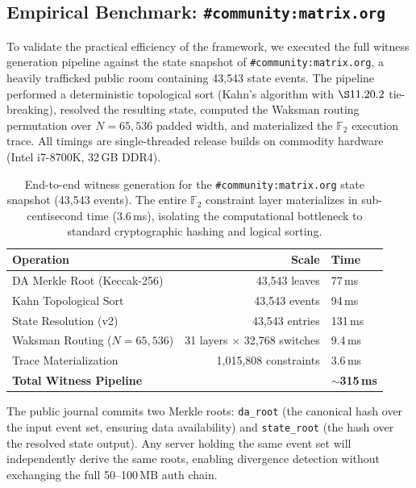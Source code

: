 \documentclass[11pt,a4paper]{article}
\begin{document}
\subsection{Empirical Benchmark: \texttt{\#community:matrix.org}}\label{sec:bench}

To validate the practical efficiency of the framework, we executed the
full witness generation pipeline against the state snapshot of
\texttt{\#community:matrix.org}, a heavily trafficked public room
containing 43{,}543 state events.  The pipeline performed a
deterministic topological sort (Kahn's algorithm with
$\S11.20.2$ tie-breaking), resolved the resulting state,
computed the Waksman routing permutation over $N = 65{,}536$ padded
width, and materialized the $\mathbb{F}_2$ execution trace.
All timings are single-threaded release builds on commodity hardware
(Intel i7-8700K, 32\,GB DDR4).

\begin{table}[h]
\centering
\begin{tabular}{@{}lrl@{}}
\toprule
\textbf{Operation} & \textbf{Scale} & \textbf{Time} \\
\midrule
DA Merkle Root (Keccak-256) & 43{,}543 leaves & 77\,ms \\
Kahn Topological Sort       & 43{,}543 events & 94\,ms \\
State Resolution (v2)       & 43{,}543 entries & 131\,ms \\
Waksman Routing ($N{=}65{,}536$) & 31 layers $\times$ 32{,}768 switches & 9.4\,ms \\
Trace Materialization       & 1{,}015{,}808 constraints & 3.6\,ms \\
\midrule
\textbf{Total Witness Pipeline} & & \textbf{$\sim$315\,ms} \\
\bottomrule
\end{tabular}
\caption{End-to-end witness generation for the
\texttt{\#community:matrix.org} state snapshot (43{,}543 events).
The entire $\mathbb{F}_2$ constraint layer materializes in
sub-centisecond time (3.6\,ms), isolating the computational
bottleneck to standard cryptographic hashing and logical sorting.}
\label{tab:benchmark}
\end{table}

The public journal commits two Merkle roots:
\texttt{da\_root} (the canonical hash over the input event set,
ensuring data availability) and \texttt{state\_root}
(the hash over the resolved state output).
Any server holding the same event set will independently derive
the same roots, enabling divergence detection without exchanging
the full 50--100\,MB auth chain.
\end{document}
